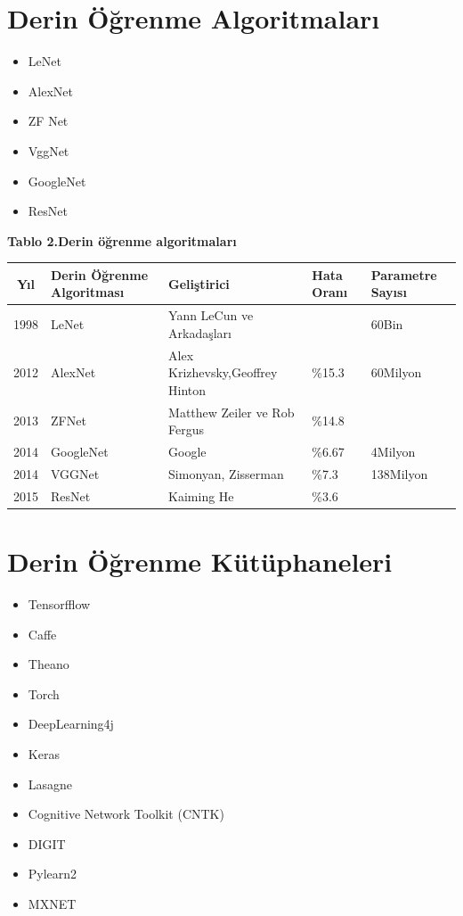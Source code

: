 \documentclass{article}
\begin{document}
\newpage
\section{Derin Öğrenme Algoritmaları}
\vspace{5pt}
\begin{itemize}
    \item LeNet
    \item AlexNet
    \item ZF Net
    \item VggNet
    \item GoogleNet
    \item ResNet
\end{itemize}

\begin{center}
    
\textbf{Tablo 2.Derin öğrenme algoritmaları}
\end{center}
\vspace{10pt}

\begin{tabular}{c|p{3cm}|p{3cm}|p{2cm}|p{3cm}}
  \textbf{Yıl} & \textbf{Derin Öğrenme Algoritması} & \textbf{Geliştirici} & \textbf{Hata Oranı} & \textbf{Parametre Sayısı} \\
  \hline
  1998 & LeNet & Yann LeCun ve Arkadaşları &  & 60Bin\\
  \hline
  2012 & AlexNet & Alex Krizhevsky,Geoffrey Hinton & \%15.3  & 60Milyon\\
  \hline
  2013 & ZFNet & Matthew Zeiler ve Rob Fergus & \%14.8 & \\
  \hline
  2014 & GoogleNet & Google & \%6.67 & 4Milyon\\
  \hline
  2014 & VGGNet & Simonyan, Zisserman & \%7.3 & 138Milyon\\
  \hline
  2015 & ResNet & Kaiming He & \%3.6 & \\
\end{tabular}
\vspace{10pt}
\section{Derin Öğrenme Kütüphaneleri}

\begin{multicols}{2}
\begin{itemize}
    \item Tensorfflow
    \item Caffe
    \item Theano
    \item Torch
    \item DeepLearning4j
    \item Keras
    \item Lasagne
    \item Cognitive Network Toolkit (CNTK)
    \item DIGIT
    \item Pylearn2
    \item MXNET    
\end{itemize}
\end{multicols}
\end{document}
